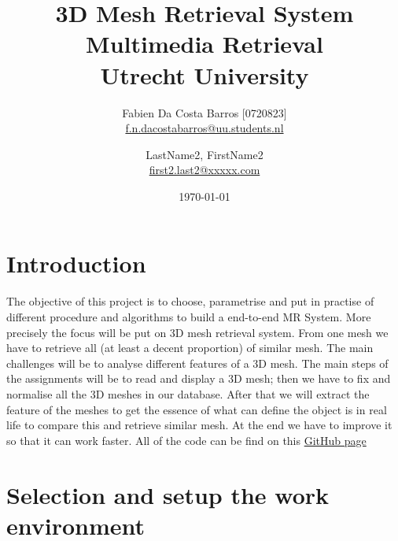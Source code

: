 \documentclass[10pt,twocolumn,letterpaper]{article}
\title{%
  3D Mesh Retrieval System \\
  \large Multimedia Retrieval \\
    Utrecht University}
\author{
  Fabien Da Costa Barros [0720823]\\
  \url{f.n.dacostabarros@uu.students.nl}
  \and
  LastName2, FirstName2\\
  \url{first2.last2@xxxxx.com}
}
\date{\today}
\begin{document}
\maketitle
{}
\section*{Introduction}
The objective of this project is to choose, parametrise and put in practise of different procedure and algorithms to build a end-to-end MR System. More precisely the focus will be put on 3D mesh retrieval system. From one mesh we have to retrieve all (at least a decent proportion) of similar mesh. The main challenges will be to analyse different features of a 3D mesh. The main steps of the assignments will be to read and display a 3D mesh; then we have to fix and normalise all the 3D meshes in our database. After that we will extract the feature of the meshes to get the essence of what can define the object is in real life to compare this and retrieve similar mesh. At the end we have to improve it so that it can work faster. All of the code can be find on this \href{https://github.com/FDaCostaB/3DMeshRetrievalSystem}{GitHub page}  

\section{Selection and setup the work environment}
\end{document}
